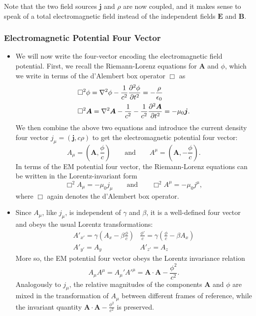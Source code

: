 \documentclass[11pt, a4paper]{article}
\newcommand{\eqtext}[1]{\qquad \text{#1} \qquad}
\renewcommand{\vec}[1]{\bm{#1}} %
\newcommand{\E}{\vec{E}} %
\newcommand{\B}{\vec{B}} %
\newcommand{\A}{\vec{A}} %
\newcommand{\ee}{\epsilon_{0}}  %
\newcommand{\mm}{\mu_{0}}  %
\renewcommand{\j}{\vec{j}}  %
\renewcommand{\laplacian}{\nabla^{2}}
\begin{document}
\begin{itemize}
    Note that the two field sources $ \j $ and $ \rho $ are now coupled, and it makes sense to speak of a total electromagnetic field instead of the independent fields $ \E $ and $ \B $.
	
\end{itemize}

\subsubsection{Electromagnetic Potential Four Vector}
\begin{itemize}
	\item We will now write the four-vector encoding the electromagnetic field potential. First, we recall the Riemann-Lorenz equations for $ \A  $ and $ \phi $, which we write in terms of the d'Alembert box operator $ \Box $ as
	\begin{align*}
		& \Box^{2}\phi = \laplacian \phi - \frac{1}{c^{2}}\pdv[2]{\phi}{t} = - \frac{\rho}{\ee}\\
		&\Box^{2} \A = \laplacian \A - \frac{1}{c^{2}} - \frac{1}{c^{2}} \pdv[2]{\A}{t} = - \mm \j.
	\end{align*}
    We then combine the above two equations and introduce the current density four vector $ j_{\mu} = (\j, c\rho) $ to get the electromagnetic potential four vector:
	\begin{equation*}
		A_{\mu} = \left (\A, \frac{\phi}{c}\right ) \eqtext{and} A^{\mu} = \left (\A, -\frac{\phi}{c}\right ).
	\end{equation*}
	In terms of the EM potential four vector, the Riemann-Lorenz equations can be written in the Lorentz-invariant form
	\begin{equation*}
		\Box ^{2}A_{\mu} = - \mm j_{\mu} \eqtext{and} \Box^{2}A^{\mu} = - \mm j^{\mu},
	\end{equation*}
    where $ \Box $ again denotes the d'Alembert box operator.
	
	\item Since $ A_{\mu} $, like $ j_{\mu} $, is independent of $ \gamma $ and $ \beta $, it is a well-defined four vector and obeys the usual Lorentz transformations:
	\begin{equation*}
        \begin{array}{ll}
            A'_{x'} = \gamma \left(A_{x} - \beta \frac{\phi}{c} \right) & \frac{\phi'}{c} = \gamma \left(\frac{\phi}{c} - \beta A_{x}\right) \\
            A'_{y'} = A_{y} & A'_{z'} = A_{z}
        \end{array}
	\end{equation*}
	More so, the EM potential four vector obeys the Lorentz invariance relation
	\begin{equation*}
		A_{\mu}A^{\mu} = A_{\mu}' A'^{\mu} = \A \cdot \A - \frac{\phi^{2}}{c^{2}}.
	\end{equation*}
    Analogously to $ j_{\mu} $, the relative magnitudes of the components $ \A $ and $ \phi $ are mixed in the transformation of $ A_{\mu} $ between different frames of reference, while the invariant quantity $ \A \cdot \A - \frac{\phi^{2}}{c^{2}} $ is preserved.
\end{itemize}
\end{document}
